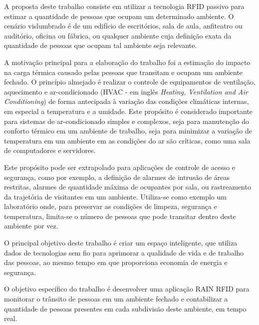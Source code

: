 A proposta deste trabalho consiste em utilizar a tecnologia RFID passivo para estimar a quantidade de pessoas que ocupam um determinado ambiente. O cenário vislumbrado é de um edifício de escritórios, sala de aula, anfiteatro ou auditório, oficina ou fábrica, ou qualquer ambiente cuja definição exata da quantidade de pessoas que ocupam tal ambiente seja relevante.

A motivação principal para a elaboração do trabalho foi a estimação do impacto na carga térmica causado pelas pessoas que transitam e ocupam um ambiente fechado. O princípio almejado é realizar o controle de equipamentos de ventilação, aquecimento e ar-condicionado (HVAC - em inglês \textit{Heating, Ventilation and Air Conditioning}) de forma antecipada à variação das condições climáticas internas, em especial a temperatura e a umidade. Este propósito é considerado importante para sistemas de ar-condicionado simples e complexos, seja para manutenção do conforto térmico em um ambiente de trabalho, seja para minimizar a variação de temperatura em um ambiente em as condições do ar são críticas, como uma sala de computadores e servidores.

Este propósito pode ser extrapolado para aplicações de controle de acesso e segurança, como por exemplo, a definição de alarmes de intrusão de áreas restritas, alarmes de quantidade máxima de ocupantes por sala, ou rastreamento da trajetória de visitantes em um ambiente. Utiliza-se como exemplo um laboratório onde, para preservar as condições de limpeza, segurança e temperatura, limita-se o número de pessoas que pode transitar dentro deste ambiente por vez.

O principal objetivo deste trabalho é criar um espaço inteligente, que utiliza dados de tecnologias sem fio para aprimorar a qualidade de vida e de trabalho das pessoas, ao mesmo tempo em que proporciona economia de energia e segurança.

O objetivo específico do trabalho é desenvolver uma aplicação RAIN RFID para monitorar o trânsito de pessoas em um ambiente fechado e contabilizar a quantidade de pessoas presentes em cada subdivisão deste ambiente, em tempo real.